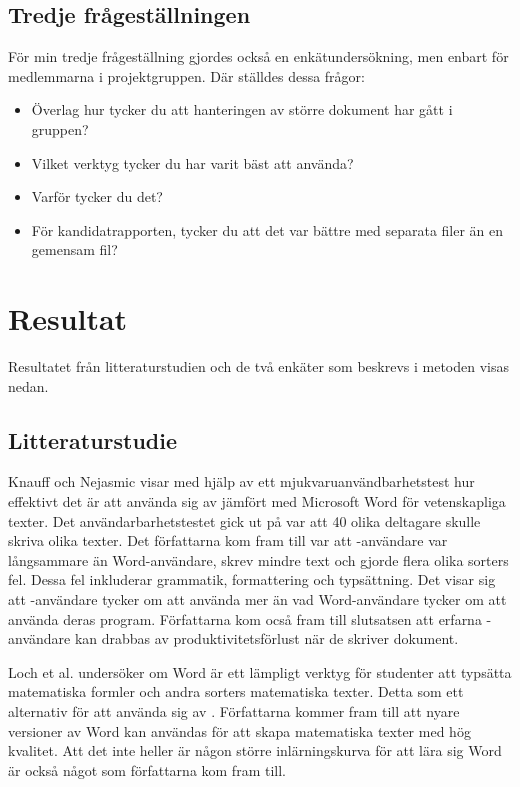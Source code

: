 \subsection{Tredje frågeställningen}

För min tredje frågeställning gjordes också en enkätundersökning, men enbart för medlemmarna i projektgruppen. Där ställdes dessa frågor:
\begin{itemize}
	\item Överlag hur tycker du att hanteringen av större dokument har gått i gruppen?
	\item Vilket verktyg tycker du har varit bäst att använda?
	\item Varför tycker du det?
	\item För kandidatrapporten, tycker du att det var bättre med separata filer än en gemensam fil?
\end{itemize}

\section{Resultat}
\label{sec:results-tuhkala}
Resultatet från litteraturstudien och de två enkäter som beskrevs i metoden visas nedan.

\subsection{Litteraturstudie}
Knauff och Nejasmic \cite{knauff2014efficiency} visar med hjälp av ett mjukvaruanvändbarhetstest hur effektivt det är att använda sig av \latex jämfört med Microsoft Word för vetenskapliga texter. Det användarbarhetstestet gick ut på var att 40 olika deltagare skulle skriva olika texter.
Det författarna kom fram till var att \latex-användare var långsammare än Word-användare, skrev mindre text och gjorde flera olika sorters fel. Dessa fel inkluderar grammatik, formattering och typsättning. Det visar sig att \latex-användare tycker om att använda \latex mer än vad Word-användare tycker om att använda deras program. Författarna kom ocså fram till slutsatsen att erfarna \latex-användare kan drabbas av produktivitetsförlust när de skriver dokument.

Loch et al. \cite{loch2014master} undersöker om Word är ett lämpligt verktyg för studenter att typsätta matematiska formler och andra sorters matematiska texter. Detta som ett alternativ för att använda sig av \latex. Författarna kommer fram till att nyare versioner av Word kan användas för att skapa matematiska texter med hög kvalitet. Att det inte heller är någon större inlärningskurva för att lära sig Word är också något som författarna kom fram till.

